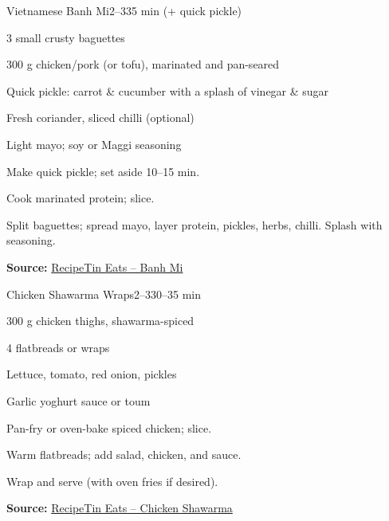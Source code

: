 \begin{recipebox}{Vietnamese Banh Mi}{2--3}{35 min (+ quick pickle)}
\begin{ingredients}
  \item 3 small crusty baguettes
  \item 300 g chicken/pork (or tofu), marinated and pan-seared
  \item Quick pickle: carrot \& cucumber with a splash of vinegar \& sugar
  \item Fresh coriander, sliced chilli (optional)
  \item Light mayo; soy or Maggi seasoning
\end{ingredients}
\begin{method}
  \item Make quick pickle; set aside 10--15 min.
  \item Cook marinated protein; slice.
  \item Split baguettes; spread mayo, layer protein, pickles, herbs, chilli. Splash with seasoning.
\end{method}
\textbf{Source:} \href{https://www.recipetineats.com/banh-mi-vietnamese-sandwich/}{RecipeTin Eats – Banh Mi}
\end{recipebox}

\begin{recipebox}{Chicken Shawarma Wraps}{2--3}{30–35 min}
\begin{ingredients}
  \item 300 g chicken thighs, shawarma-spiced
  \item 4 flatbreads or wraps
  \item Lettuce, tomato, red onion, pickles
  \item Garlic yoghurt sauce or toum
\end{ingredients}
\begin{method}
  \item Pan-fry or oven-bake spiced chicken; slice.
  \item Warm flatbreads; add salad, chicken, and sauce.
  \item Wrap and serve (with oven fries if desired).
\end{method}
\textbf{Source:} \href{https://www.recipetineats.com/chicken-shawarma-middle-eastern/}{RecipeTin Eats – Chicken Shawarma}
\end{recipebox}

